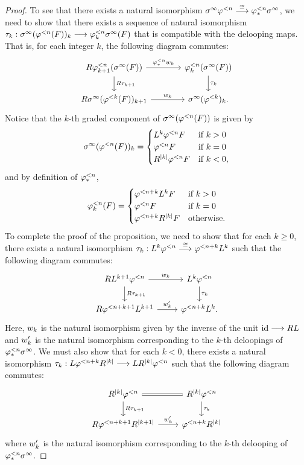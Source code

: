 \begin{proof}
To see that there exists a natural isomorphism $\spectHI \tlHI{n}
\stackrel{\cong}{\to} \tlHM{n}\spectHI$, we need to show that
there exists a sequence of natural isomorphism 
$\tau_k: \spectHI(\tlHI{n}(F))_k \to \tlHM[k]{n}\spectHI(F)$ that is
compatible with the delooping maps. That is, for each integer $k$, the 
following diagram commutes:
\[
\begin{tikzcd}[column sep=large]
R\tlHM[k + 1]{n}(\spectHI(F)) \arrow{r}{\tlHM{n}\deloop_k}\arrow{d}{R\tau_{k + 1}} &
\tlHM[k]{n}(\spectHI(F)) \arrow{d}{\tau_k} \\
R\spectHI(\tlHI{k}(F))_{k + 1} \arrow{r}{\deloop_k} &
\spectHI(\tlHI{k})_k.
\end{tikzcd}
\]
Notice that the $k$-th graded component of 
$\spectHI(\tlHI{n}(F))$ is given by
\[
\spectHI(\tlHI{n}(F))_k = \begin{cases}
L^k\tlHI{n}F &\textrm{if }k > 0\\
\tlHI{n}F    &\textrm{if }k = 0\\
R^{|k|}\tlHI{n}F & \textrm{if }k < 0,
\end{cases}
\]
and by definition of $\tlHM{n}$,
\[
\tlHM[k]{n}(F) = 
\begin{cases}
\tlHI{n + k}L^kF &\textrm{if }k > 0\\
\tlHI{n}F &\textrm{if }k = 0\\
\tlHI{n + k}R^{|k|}F &\textrm{otherwise}.
\end{cases}
\]
To complete the proof of the proposition, we need to show that
for each $k \geq 0$, there exists a natural isomorphism $\tau_k : 
L^k\tlHI{n} \stackrel{\cong}{\to} \tlHI{n + k}L^k$
such that the following diagram commutes:
\begin{equation}\label{eq_prop_spectHI_commute_1}
\begin{tikzcd}
RL^{k + 1}\tlHI{n} \arrow{r}{\deloop_k} \arrow{d}{R\tau_{k + 1}} &
L^k\tlHI{n} \arrow{d}{\tau_k} \\
R\tlHI{n + k + 1}L^{k + 1} \arrow{r}{\deloop_k'} &
\tlHI{n + k}L^k. 
\end{tikzcd}
\end{equation}
Here, $\deloop_k$ is the natural isomorphism given by the inverse
of the unit $\id \to RL$ and $\deloop_k'$ is the natural isomorphism 
corresponding to the $k$-th deloopings of $\tlHM{n}\spectHI$.
We must also show that for each $k < 0$, there exists a natural isomorphism
$\tau_k : L\tlHI{n + k}R^{|k|} \to LR^{|k|}\tlHI{n}$ such that the
following diagram commutes:
\begin{equation}\label{eq_prop_spectHI_commute_2}
\begin{tikzcd}
R^{|k|}\tlHI{n} \arrow[equals]{r} \arrow{d}{R\tau_{k + 1}} & 
R^{|k|}\tlHI{n} \arrow{d}{\tau_k}\\
R\tlHI{n + k + 1}R^{|k + 1|} \arrow{r}{\deloop_k'} &
\tlHI{n + k}R^{|k|} 
\end{tikzcd}
\end{equation}
where $\deloop_k'$ is the natural isomorphism corresponding to the 
$k$-th delooping of $\tlHM{n}\spectHI$. 


\end{proof}
